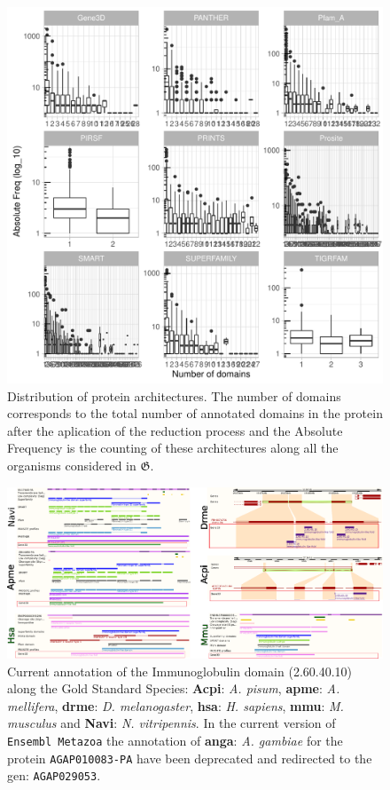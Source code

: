 \documentclass[12pt]{article}
\begin{document}
\begin{figure}[hb!]
\begin{center}
\includegraphics[scale=0.8]{architecturesDomains}
\caption{Distribution of protein architectures. The number of domains 
corresponds to the total number of annotated domains in the protein after the 
aplication of the reduction process and the Absolute Frequency is the counting 
of these architectures along all the organisms considered 
in $\boldsymbol{\mathfrak{G}}$.}
\label{fig:groups_arch}
\end{center}
\end{figure}

\begin{figure}[ht!]
\begin{center}
\includegraphics[scale=0.4]{most_freq}
\caption{Current annotation of the Immunoglobulin domain (2.60.40.10) along 
the Gold Standard Species: 
\textbf{Acpi}: \textit{A. pisum}, \textbf{apme}: \textit{A. mellifera}, 
\textbf{drme}: \textit{D. melanogaster}, 
\textbf{hsa}: \textit{H. sapiens}, \textbf{mmu}: \textit{M. musculus} and 
\textbf{Navi}: \textit{N. vitripennis}. In the current version of 
\texttt{Ensembl Metazoa} the annotation of \textbf{anga}: \textit{A. gambiae} 
for the protein \texttt{AGAP010083-PA} have been deprecated and redirected to 
the gen: \texttt{AGAP029053}.}
\label{fig:immunoglob}
\end{center}
\end{figure}
\end{document}
